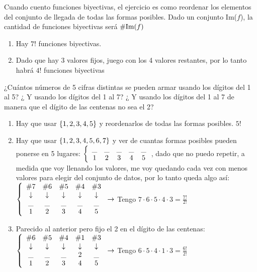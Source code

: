 \documentclass[12pt,a4paper, spanish]{article}
\begin{document}
\separadorCorto

Cuando cuento funciones biyectivas, el ejercicio es como reordenar los elementos del conjunto de llegada de todas las
formas posibles. Dado un conjunto Im($f$), la cantidad de funciones biyectivas será $\#\imagen(f)$

\begin{enumerate}[label=\roman*)]
	\item Hay $7!$ funciones biyectivas.
	\item Dado que hay 3 valores fijos, juego con los 4 valores restantes, por lo tanto habrá $4!$ funciones biyectivas
\end{enumerate}

\ejercicio
¿Cuántos números de 5 cifras distintas se pueden armar usando los dígitos del 1 al 5?
¿ Y usando los dígitos del 1 al 7? ¿ Y usando los dígitos del 1 al 7 de manera que el dígito de las centenas no sea el 2?
\begin{enumerate}[label=\arabic*)]
	\item Hay que usar $\set{1,2,3,4,5}$ y reordenarlos de todas las formas posibles. $5!$

	\item Hay que usar $\set{1,2,3,4,5,6,7}$ y ver de cuantas formas posibles pueden ponerse en 5 lugares:
	      $\llave{c c c c c}{
			      \_ & \_ & \_& \_& \_ \\
			      1 & 2 &3 &4 &5
		      }$, dado que no puedo repetir, a medida que voy llenando los valores, me voy quedando cada vez con menos valores
	      para elegir del conjunto de datos, por lo tanto queda algo así:
	      $\llave{c c c c c}{
			      \#7 & \#6 & \#5 & \#4 &\#3 \\
			      \downarrow &\downarrow &\downarrow &\downarrow &\downarrow\\
			      \_ & \_ & \_& \_& \_ \\
			      1 & 2 &3 &4 &5
		      }\to$ Tengo $7 \cdot 6 \cdot 5 \cdot 4 \cdot 3 = \frac{7!}{2!} $ 

	\item Parecido al anterior pero fijo el 2 en el dígito de las centenas:\\
	      $\llave{c c c c c}{
			      \#6 & \#5 & \#4 & \#1 &\#3 \\
			      \downarrow &\downarrow &\downarrow &\downarrow &\downarrow\\
			      \_ & \_ & \_& 2 & \_ \\
			      1 & 2 &3 &4 &5
		      }
		      \to $ Tengo $6 \cdot 5 \cdot 4 \cdot 1 \cdot 3 = \frac{6!}{2!} $ 
\end{enumerate}
\end{document}
